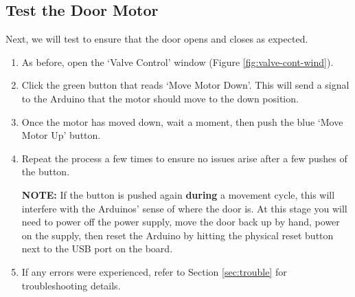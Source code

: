 \documentclass{article}
\begin{document}
\subsection{Test the Door Motor}
Next, we will test to ensure that the door opens and closes as expected. 
\begin{enumerate}
    \item As before, open the `Valve Control' window (Figure \ref{fig:valve-cont-wind}). 
    \item Click the green button that reads `Move Motor Down'. This will send a signal to the Arduino that the 
        motor should move to the down position. 
    \item Once the motor has moved down, wait a moment, then push the blue `Move Motor Up' button.
    \item Repeat the process a few times to ensure no issues arise after a few pushes of the button. 
        \par \textbf{NOTE:} If the button is pushed again \textbf{during} a movement cycle, this will interfere with the 
        Arduinos' sense of where the door is. At this stage you will need to power off the power supply, move the door back up by hand, power on the supply, then reset the Arduino by hitting 
        the physical reset button next to the USB port on the board.
    \item If any errors were experienced, refer to Section \ref{sec:trouble} for troubleshooting details.
\end{enumerate}
\end{document}

